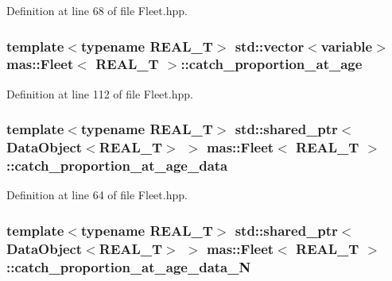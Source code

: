 Definition at line 68 of file Fleet.\-hpp.

\hypertarget{structmas_1_1_fleet_ad4ec4a206dbb1af192c85ae7ab0929ea}{
\subsubsection[{catch\-\_\-proportion\-\_\-at\-\_\-age}]{\setlength{\rightskip}{0pt plus 5cm}template$<$typename R\-E\-A\-L\-\_\-\-T$>$ std\-::vector$<${\bf variable}$>$ {\bf mas\-::\-Fleet}$<$ R\-E\-A\-L\-\_\-\-T $>$\-::catch\-\_\-proportion\-\_\-at\-\_\-age}}\label{structmas_1_1_fleet_ad4ec4a206dbb1af192c85ae7ab0929ea}


Definition at line 112 of file Fleet.\-hpp.

\hypertarget{structmas_1_1_fleet_ae6c54a589f2e6cbdb413e3759bffca5d}{
\subsubsection[{catch\-\_\-proportion\-\_\-at\-\_\-age\-\_\-data}]{\setlength{\rightskip}{0pt plus 5cm}template$<$typename R\-E\-A\-L\-\_\-\-T$>$ std\-::shared\-\_\-ptr$<${\bf Data\-Object}$<$R\-E\-A\-L\-\_\-\-T$>$ $>$ {\bf mas\-::\-Fleet}$<$ R\-E\-A\-L\-\_\-\-T $>$\-::catch\-\_\-proportion\-\_\-at\-\_\-age\-\_\-data}}\label{structmas_1_1_fleet_ae6c54a589f2e6cbdb413e3759bffca5d}


Definition at line 64 of file Fleet.\-hpp.

\hypertarget{structmas_1_1_fleet_a39314db6371bbf66ec72d41e871e6eca}{
\subsubsection[{catch\-\_\-proportion\-\_\-at\-\_\-age\-\_\-data\-\_\-\-N}]{\setlength{\rightskip}{0pt plus 5cm}template$<$typename R\-E\-A\-L\-\_\-\-T$>$ std\-::shared\-\_\-ptr$<${\bf Data\-Object}$<$R\-E\-A\-L\-\_\-\-T$>$ $>$ {\bf mas\-::\-Fleet}$<$ R\-E\-A\-L\-\_\-\-T $>$\-::catch\-\_\-proportion\-\_\-at\-\_\-age\-\_\-data\-\_\-\-N}}\label{structmas_1_1_fleet_a39314db6371bbf66ec72d41e871e6eca}


